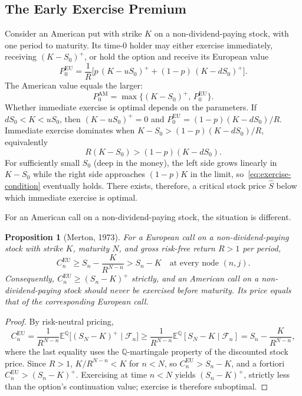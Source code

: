 \documentclass[11pt,a4paper]{article}
\theoremstyle{plain}
\newtheorem{proposition}[theorem]{Proposition}
\theoremstyle{definition}
\newcommand{\E}{\mathbb{E}}
\newcommand{\Q}{\mathbb{Q}}
\begin{document}
\subsection{The Early Exercise Premium}
\label{subsec:early-exercise}

Consider an American put with strike $K$ on a non-dividend-paying stock,
with one period to maturity. Its time-$0$ holder may either exercise
immediately, receiving $(K - S_0)^+$, or hold the option and receive its
European value
\[
P_0^{\mathrm{EU}} = \frac{1}{R}\bigl[ p\, (K - uS_0)^+ + (1-p)\,(K - dS_0)^+\bigr].
\]
The American value equals the larger:
\begin{equation}
    \label{eq:american-1period}
    P_0^{\mathrm{AM}} = \max\bigl\{ (K - S_0)^+,\, P_0^{\mathrm{EU}} \bigr\}.
\end{equation}
Whether immediate exercise is optimal depends on the parameters. If
$dS_0 < K < uS_0$, then $(K - uS_0)^+ = 0$ and
$P_0^{\mathrm{EU}} = (1-p)(K - dS_0)/R$. Immediate exercise dominates
when $K - S_0 > (1-p)(K - dS_0)/R$, equivalently
\begin{equation}
    \label{eq:exercise-condition}
    R(K - S_0) > (1-p)(K - dS_0).
\end{equation}
For sufficiently small $S_0$ (deep in the money), the left side grows
linearly in $K - S_0$ while the right side approaches $(1-p)K$ in the
limit, so~\eqref{eq:exercise-condition} eventually holds. There exists,
therefore, a critical stock price $\hat{S}$ below which immediate
exercise is optimal.

For an American call on a non-dividend-paying stock, the situation is
different.

\begin{proposition}[Merton, 1973]
\label{prop:no-early-call}
For a European call on a non-dividend-paying stock with strike $K$,
maturity $N$, and gross risk-free return $R > 1$ per period,
\[
C_n^{\mathrm{EU}} \geq S_n - \frac{K}{R^{N-n}} > S_n - K
\quad \text{at every node } (n, j).
\]
Consequently, $C_n^{\mathrm{EU}} \geq (S_n - K)^+$ strictly, and an
American call on a non-dividend-paying stock should never be exercised
before maturity. Its price equals that of the corresponding European
call.
\end{proposition}

\begin{proof}
By risk-neutral pricing,
\[
C_n^{\mathrm{EU}} = \frac{1}{R^{N-n}} \E^{\Q}\bigl[(S_N - K)^+ \mid \mathcal{F}_n\bigr]
\geq \frac{1}{R^{N-n}} \E^{\Q}[S_N - K \mid \mathcal{F}_n]
= S_n - \frac{K}{R^{N-n}},
\]
where the last equality uses the $\Q$-martingale property of the
discounted stock price. Since $R > 1$, $K/R^{N-n} < K$ for $n < N$, so
$C_n^{\mathrm{EU}} > S_n - K$, and a fortiori
$C_n^{\mathrm{EU}} > (S_n - K)^+$. Exercising at time $n < N$ yields
$(S_n - K)^+$, strictly less than the option's continuation value;
exercise is therefore suboptimal.
\end{proof}
\end{document}
